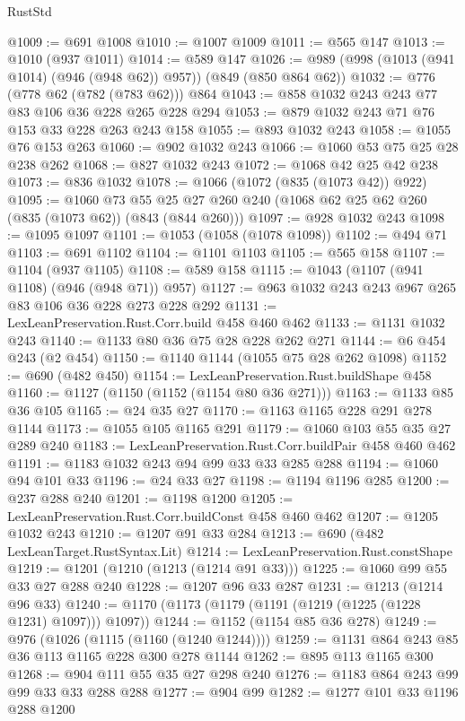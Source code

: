 \begin{lexlean}{RustStd}
\begin{coremodule}
{\begin{coremodule}
{{{{{{{{{@1009 := @691 @1008
@1010 := @1007 @1009
@1011 := @565 @147
@1013 := @1010 (@937 @1011)
@1014 := @589 @147
@1026 := @989 (@998 (@1013 (@941 @1014) (@946 (@948 @62)) @957)) (@849 (@850 @864 @62))
@1032 := @776 (@778 @62 (@782 (@783 @62))) @864
@1043 := @858 @1032 @243 @243 @77 @83 @106 @36 @228 @265 @228 @294
@1053 := @879 @1032 @243 @71 @76 @153 @33 @228 @263 @243 @158
@1055 := @893 @1032 @243
@1058 := @1055 @76 @153 @263
@1060 := @902 @1032 @243
@1066 := @1060 @53 @75 @25 @28 @238 @262
@1068 := @827 @1032 @243
@1072 := @1068 @42 @25 @42 @238
@1073 := @836 @1032
@1078 := @1066 (@1072 (@835 (@1073 @42)) @922)
@1095 := @1060
    @73
    @55
    @25
    @27
    @260
    @240
    (@1068 @62 @25 @62 @260 (@835 (@1073 @62)) (@843 (@844 @260)))
@1097 := @928 @1032 @243
@1098 := @1095 @1097
@1101 := @1053 (@1058 (@1078 @1098))
@1102 := @494 @71
@1103 := @691 @1102
@1104 := @1101 @1103
@1105 := @565 @158
@1107 := @1104 (@937 @1105)
@1108 := @589 @158
@1115 := @1043 (@1107 (@941 @1108) (@946 (@948 @71)) @957)
@1127 := @963 @1032 @243 @243 @967 @265 @83 @106 @36 @228 @273 @228 @292
@1131 := LexLeanPreservation.Rust.Corr.build @458 @460 @462
@1133 := @1131 @1032 @243
@1140 := @1133 @80 @36 @75 @28 @228 @262 @271
@1144 := @6 @454 @243 (@2 @454)
@1150 := @1140 @1144 (@1055 @75 @28 @262 @1098)
@1152 := @690 (@482 @450)
@1154 := LexLeanPreservation.Rust.buildShape @458
@1160 := @1127 (@1150 (@1152 (@1154 @80 @36 @271)))
@1163 := @1133 @85 @36 @105
@1165 := @24 @35 @27
@1170 := @1163 @1165 @228 @291 @278 @1144
@1173 := @1055 @105 @1165 @291
@1179 := @1060 @103 @55 @35 @27 @289 @240
@1183 := LexLeanPreservation.Rust.Corr.buildPair @458 @460 @462
@1191 := @1183 @1032 @243 @94 @99 @33 @33 @285 @288
@1194 := @1060 @94 @101 @33
@1196 := @24 @33 @27
@1198 := @1194 @1196 @285
@1200 := @237 @288 @240
@1201 := @1198 @1200
@1205 := LexLeanPreservation.Rust.Corr.buildConst @458 @460 @462
@1207 := @1205 @1032 @243
@1210 := @1207 @91 @33 @284
@1213 := @690 (@482 LexLeanTarget.RustSyntax.Lit)
@1214 := LexLeanPreservation.Rust.constShape
@1219 := @1201 (@1210 (@1213 (@1214 @91 @33)))
@1225 := @1060 @99 @55 @33 @27 @288 @240
@1228 := @1207 @96 @33 @287
@1231 := @1213 (@1214 @96 @33)
@1240 := @1170 (@1173 (@1179 (@1191 (@1219 (@1225 (@1228 @1231) @1097))) @1097))
@1244 := @1152 (@1154 @85 @36 @278)
@1249 := @976 (@1026 (@1115 (@1160 (@1240 @1244))))
@1259 := @1131 @864 @243 @85 @36 @113 @1165 @228 @300 @278 @1144
@1262 := @895 @113 @1165 @300
@1268 := @904 @111 @55 @35 @27 @298 @240
@1276 := @1183 @864 @243 @99 @99 @33 @33 @288 @288
@1277 := @904 @99
@1282 := @1277 @101 @33 @1196 @288 @1200
}}}}}}}}}
\end{coremodule}}
\end{coremodule}
\end{lexlean}
